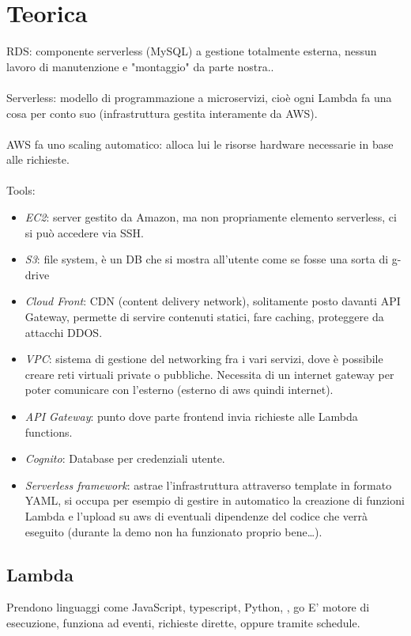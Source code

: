 \documentclass{classes/base}
\begin{document}
    \section*{Teorica}
    RDS: componente serverless (MySQL) a gestione totalmente esterna, nessun lavoro di manutenzione e "montaggio" da parte nostra..
    \\\\
    Serverless: modello di programmazione a microservizi, cioè ogni Lambda fa una cosa per conto suo (infrastruttura gestita interamente da AWS).
    \\\\
    AWS fa uno scaling automatico: alloca lui le risorse hardware necessarie in base alle richieste.
    \\\\
    Tools:
    \begin{itemize}
        \item \textit{EC2}: server gestito da Amazon, ma non propriamente elemento serverless, ci si può accedere via SSH.
        \item \textit{S3}: file system, è un DB che si mostra all'utente come se fosse una sorta di g-drive
        \item \textit{Cloud Front}: CDN (content delivery network), solitamente posto davanti API Gateway, permette di servire contenuti statici, fare caching, proteggere da attacchi DDOS.
        \item \textit{VPC}: sistema di gestione del networking fra i vari servizi, dove è possibile creare reti virtuali private o pubbliche. Necessita di un internet gateway per poter comunicare con l’esterno (esterno di aws quindi internet).
        \item \textit{API Gateway}: punto dove parte frontend invia richieste alle Lambda functions.
        \item \textit{Cognito}: Database per credenziali utente.
        \item \textit{Serverless framework}: astrae l’infrastruttura attraverso template in formato YAML, si occupa per esempio di gestire in automatico la creazione di funzioni Lambda e l’upload su aws di eventuali dipendenze del codice che verrà eseguito (durante la demo non ha funzionato proprio bene…).
    \end{itemize}

    \subsection*{Lambda}
    Prendono linguaggi come JavaScript, typescript, Python, , go
    E' motore di esecuzione, funziona ad eventi, richieste dirette, oppure tramite schedule.
\end{document}
